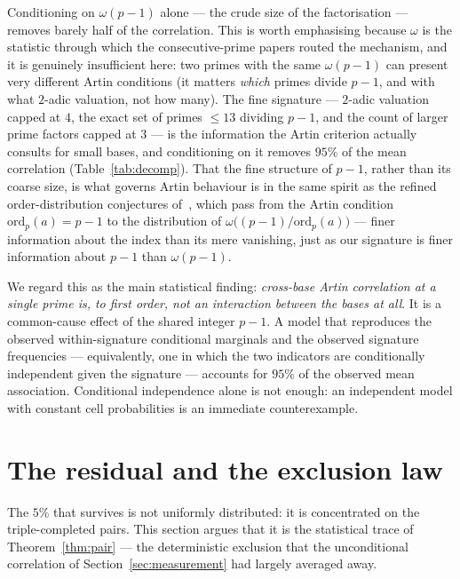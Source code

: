 \documentclass[11pt,reqno]{amsart}
\theoremstyle{plain}
\theoremstyle{definition}
\begin{document}
Conditioning on $\omega(p-1)$ alone --- the crude size of the factorisation
--- removes barely half of the correlation. This is worth emphasising because
$\omega$ is the statistic through which the consecutive-prime papers routed
the mechanism, and it is genuinely insufficient here: two primes with the same
$\omega(p-1)$ can present very different Artin conditions (it matters
\emph{which} primes divide $p-1$, and with what $2$-adic valuation, not how
many). The fine signature --- $2$-adic valuation capped at $4$, the exact set
of primes $\le 13$ dividing $p - 1$, and the count of larger prime factors
capped at $3$ --- is the information the Artin criterion actually consults
for small bases, and conditioning on it removes $95\%$ of the mean
correlation (Table~\ref{tab:decomp}). That the fine structure of $p-1$, rather
than its coarse size, is what governs Artin behaviour is in the same spirit as
the refined order-distribution conjectures
of~\cite{GoldmakherMartinPeringuey2025}, which pass from the Artin condition
$\mathrm{ord}_p(a) = p-1$ to the distribution of
$\omega\bigl((p-1)/\mathrm{ord}_p(a)\bigr)$ --- finer information about the
index than its mere vanishing, just as our signature is finer information about
$p-1$ than $\omega(p-1)$.

We regard this as the main statistical finding: \emph{cross-base Artin
correlation at a single prime is, to first order, not an interaction between
the bases at all}. It is a common-cause effect of the shared integer $p - 1$.
A model that reproduces the observed within-signature conditional marginals
and the observed signature frequencies --- equivalently, one in which the two
indicators are conditionally independent given the signature --- accounts for
$95\%$ of the observed mean association. Conditional independence alone is not
enough: an independent model with constant cell probabilities is an immediate
counterexample.

\section{The residual and the exclusion law}
\label{sec:entanglement}

The $5\%$ that survives is not uniformly distributed: it is concentrated on the triple-completed pairs. This section argues that it is the statistical trace of Theorem~\ref{thm:pair} --- the
deterministic exclusion that the unconditional correlation of
Section~\ref{sec:measurement} had largely averaged away.
\end{document}
